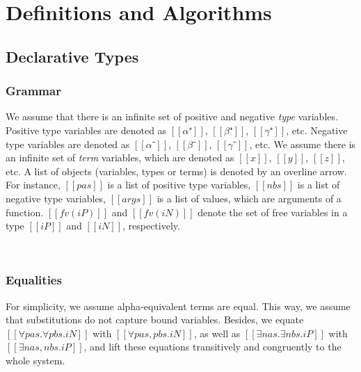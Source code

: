 
\newcommand{\apppref}{:app}
\renewcommand{\ruleref}[1]{\nameref{\apppref#1}}

\section{Definitions and Algorithms} 
\label{appendix}

\subsection{Declarative Types}

\subsubsection{Grammar}
We assume that there is an infinite set of positive and 
negative \emph{type} variables. Positive type variables are denoted as 
$[[α⁺]]$, $[[β⁺]]$, $[[γ⁺]]$, etc.
Negative type variables are denoted as $[[α⁻]]$, $[[β⁻]]$, $[[γ⁻]]$, etc.
We assume there is an infinite set of \emph{term} variables,
which are denoted as $[[x]]$, $[[y]]$, $[[z]]$, etc.
A list of objects (variables, types or terms) is denoted by
an overline arrow. For instance, $[[pas]]$ is a list of positive type variables, 
$[[nbs]]$ is a list of negative type variables, 
$[[args]]$ is a list of values, which are arguments of a function.
$[[fv(iP)]]$ and $[[fv(iN)]]$ denote the set of free variables 
in a type $[[iP]]$ and $[[iN]]$, respectively.

\begin{definition}
  \hfill\\
  \begin{minipage}[t]{0.45\textwidth}
    \ottgrammartabular{
      \ottiN\ottinterrule
    }
  \end{minipage}
  \hfill
  \begin{minipage}[t]{0.45\textwidth}
    \ottgrammartabular{
      \ottiP\ottinterrule
    }
  \end{minipage}
\end{definition}

\subsubsection{Equalities}
For simplicity, we assume alpha-equivalent terms are equal.
This way, we assume that substitutions do not capture bound variables.
Besides, we equate
$[[∀pas.∀pbs.iN]]$ with $[[∀pas,pbs.iN]]$, 
as well as $[[∃nas.∃nbs.iP]]$ with $[[∃nas,nbs.iP]]$,
and lift these equations transitively and congruently 
to the whole system.

